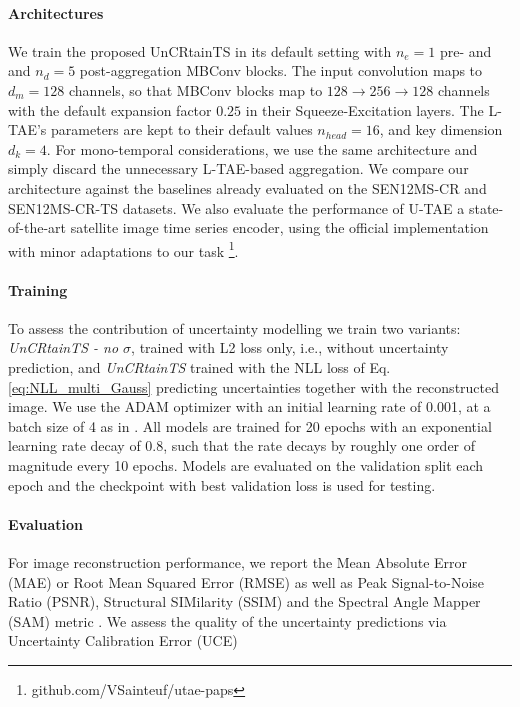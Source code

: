 \documentclass[10pt,twocolumn,letterpaper]{article}
\newcommand{\equaref}[1]{ Eq. \ref{#1}}
\begin{document}
\paragraph{\bf Architectures} We train the proposed UnCRtainTS in its default setting with $n_e=1$ pre- and and $n_d=5$ post-aggregation MBConv blocks. The input convolution maps to $d_m=128$ channels, so that MBConv blocks map to $128 \rightarrow 256 \rightarrow 128$ channels with the default expansion factor $0.25$ in their Squeeze-Excitation layers. The L-TAE's parameters are kept to their default values $n_{head}=16$, and key dimension $d_k=4$. For mono-temporal considerations, we use the same architecture and simply discard the unnecessary L-TAE-based aggregation.  We compare our architecture against the baselines already evaluated on the SEN12MS-CR \cite{ebel2020multisensor} and SEN12MS-CR-TS \cite{ebel2022sen12ms} datasets.  We also evaluate the performance of U-TAE \cite{garnot2021panoptic} a state-of-the-art satellite image time series encoder, using the official implementation with minor adaptations to our task \footnote{github.com/VSainteuf/utae-paps}.  

\paragraph{\bf Training}
To assess the contribution of uncertainty modelling we train two variants: \textit{UnCRtainTS - no $\sigma$}, trained with L2 loss only, i.e., without uncertainty prediction, and \textit{UnCRtainTS} trained with the NLL loss of \equaref{eq:NLL_multi_Gauss} predicting uncertainties together with the reconstructed image. 
We use the ADAM optimizer \cite{kingma2014adam} with an initial learning rate of 0.001, at a batch size of 4 as in \cite{garnot2021panoptic}. All models are trained for 20 epochs with an exponential learning rate decay of 0.8, such that the rate decays by roughly one order of magnitude every 10 epochs. Models are evaluated on the validation split each epoch and the checkpoint with best validation loss is used for testing. 
\label{sub:training}


\paragraph{\bf Evaluation}\label{sub:evaluation} For image reconstruction performance, we report the Mean Absolute Error (MAE) or Root Mean Squared Error (RMSE) as well as Peak Signal-to-Noise Ratio (PSNR), Structural SIMilarity (SSIM) \cite{Wang_Bovik_Sheikh_Simoncelli_2004} and the Spectral Angle Mapper (SAM) metric \cite{kruse1993spectral}. We assess the quality of the uncertainty predictions via Uncertainty Calibration Error (UCE) \cite{guo2017calibration} 
\end{document}
